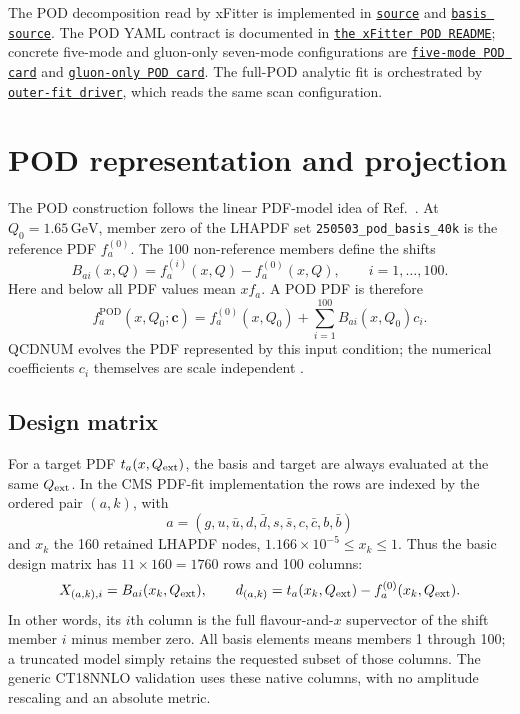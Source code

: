 \documentclass[11pt]{article}
\newcommand{\incljetscode}[2]{\href{https://github.com/HephyAnalysisSW/InclJets/blob/main/#1}{\texttt{#2}}}
\newcommand{\xfittercode}[2]{\href{https://gitlab.cern.ch/schoef/xfitter/-/blob/pod-decomposition/#1}{\texttt{#2}}}
\begin{document}
The POD decomposition read by xFitter is implemented in
\xfittercode{pdfdecomps/POD/PODPdfDecomposition.cc}{source}
and
\xfittercode{pdfdecomps/POD/PODBasis.cc}{basis source}.
The POD YAML contract is documented in
\xfittercode{pdfdecomps/POD/README.md}{the xFitter POD README}; concrete
five-mode and gluon-only seven-mode configurations are
\incljetscode{fits/SMP-22-014/figure2/pod_5mode/pod.yaml}{five-mode POD card}
and
\incljetscode{fits/SMP-22-014/figure2/pod_gluon_cms_7mode/pod.yaml}{gluon-only POD card}.
The full-POD analytic fit is orchestrated by
\incljetscode{fits/SMP-22-014/figure2/pod_mediated_fit/run_fit.py}{outer-fit driver},
which reads the same scan configuration.

\section{POD representation and projection}

The POD construction follows the linear PDF-model idea of
Ref.~\cite{LinearPDF}. At $Q_0=1.65\,\mathrm{GeV}$, member zero of the
LHAPDF set \texttt{250503\_pod\_basis\_40k} is the reference PDF
$f_a^{(0)}$. The 100 non-reference members define the shifts
\begin{equation}
  B_{ai}(x,Q) = f_a^{(i)}(x,Q)-f_a^{(0)}(x,Q),
  \qquad i=1,\ldots,100.
\end{equation}
Here and below all PDF values mean $xf_a$. A POD PDF is therefore
\begin{equation}
  f_a^{\mathrm{POD}}(x,Q_0;\boldsymbol c)=f_a^{(0)}(x,Q_0)
       +\sum_{i=1}^{100}B_{ai}(x,Q_0)c_i.
\end{equation}
QCDNUM evolves the PDF represented by this input condition; the numerical
coefficients $c_i$ themselves are scale independent \cite{QCDNUM}.

\subsection{Design matrix}

For a target PDF $t_a(x,Q_{\rm ext})$, the basis and target are always
evaluated at the same $Q_{\rm ext}$. In the CMS PDF-fit implementation the
rows are indexed by the ordered pair $(a,k)$, with
\begin{equation}
  a=(g,u,\bar u,d,\bar d,s,\bar s,c,\bar c,b,\bar b)
\end{equation}
and $x_k$ the 160 retained LHAPDF nodes,
$1.166\times10^{-5}\leq x_k\leq1$. Thus the basic design matrix has
$11\times160=1760$ rows and 100 columns:
\begin{equation}
  X_{(a,k),i}=B_{ai}(x_k,Q_{\rm ext}),
  \qquad
  d_{(a,k)}=t_a(x_k,Q_{\rm ext})-f_a^{(0)}(x_k,Q_{\rm ext}).
\end{equation}
In other words, its $i$th column is the full flavour-and-$x$ supervector of
the shift member $i$ minus member zero. All basis elements means members 1
through 100; a truncated model simply retains the requested subset of those
columns. The generic CT18NNLO validation uses these native columns, with no
amplitude rescaling and an absolute metric.
\end{document}
